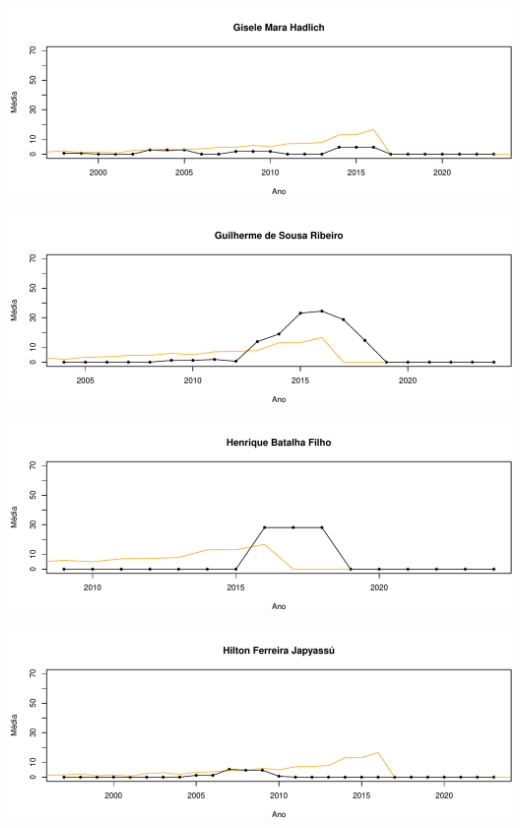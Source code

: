 \documentclass[12pt,brazil]{article}\usepackage[]{graphicx}\usepackage[]{xcolor}
\makeatletter
\def\maxwidth{ %
  \ifdim\Gin@nat@width>\linewidth
    \linewidth
  \else
    \Gin@nat@width
  \fi
}
\makeatother
\begin{document}
\vspace{0.5cm}


{\centering \includegraphics[width=\maxwidth]{figure/mediamovel-27} 

}



\vspace{0.5cm}


{\centering \includegraphics[width=\maxwidth]{figure/mediamovel-28} 

}



\vspace{0.5cm}


{\centering \includegraphics[width=\maxwidth]{figure/mediamovel-29} 

}



\vspace{0.5cm}


{\centering \includegraphics[width=\maxwidth]{figure/mediamovel-30} 

}
\end{document}

